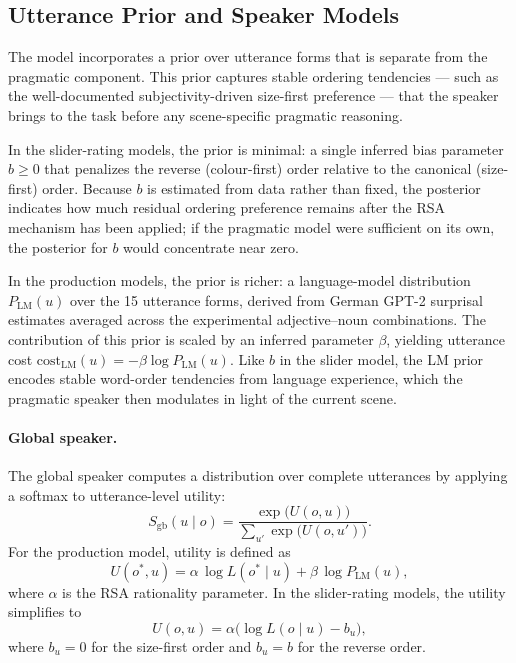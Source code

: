 \documentclass[man,floatsintext]{apa7}
\begin{document}
\subsection{Utterance Prior and Speaker Models}
\label{sec:model:speakers}

The model incorporates a prior over utterance forms that is separate from the pragmatic component.
This prior captures stable ordering tendencies --- such as the well-documented subjectivity-driven size-first preference --- that the speaker brings to the task before any scene-specific pragmatic reasoning.

In the slider-rating models, the prior is minimal: a single inferred bias parameter $b \geq 0$ that penalizes the reverse (colour-first) order relative to the canonical (size-first) order.
Because $b$ is estimated from data rather than fixed, the posterior indicates how much residual ordering preference remains after the RSA mechanism has been applied; if the pragmatic model were sufficient on its own, the posterior for $b$ would concentrate near zero.

In the production models, the prior is richer: a language-model distribution $P_\text{LM}(u)$ over the 15 utterance forms, derived from German GPT-2 surprisal estimates averaged across the experimental adjective--noun combinations.
The contribution of this prior is scaled by an inferred parameter $\beta$, yielding utterance cost $\text{cost}_\text{LM}(u) = -\beta \log P_\text{LM}(u)$.
Like $b$ in the slider model, the LM prior encodes stable word-order tendencies from language experience, which the pragmatic speaker then modulates in light of the current scene.

\paragraph{Global speaker.}
The global speaker computes a distribution over complete utterances by applying a softmax to utterance-level utility:
\begin{equation}
  S_{\text{gb}}(u \mid o)
  = \frac{\exp\!\bigl(U(o,u)\bigr)}{\sum_{u'} \exp\!\bigl(U(o,u')\bigr)}.
  \label{eq:global_speaker}
\end{equation}
For the production model, utility is defined as
\begin{equation}
  U(o^\ast,u)
  = \alpha\,\log L(o^\ast \mid u) + \beta\,\log P_{\mathrm{LM}}(u),
  \label{eq:global_utility}
\end{equation}
where $\alpha$ is the RSA rationality parameter.
In the slider-rating models, the utility simplifies to
\begin{equation}
  U(o,u) = \alpha\bigl(\log L(o \mid u) - b_u\bigr),
  \label{eq:slider_utility}
\end{equation}
where $b_u = 0$ for the size-first order and $b_u = b$ for the reverse order.
\end{document}
